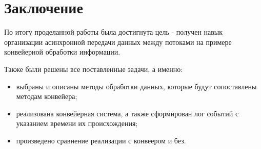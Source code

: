 \chapter*{Заключение}
По итогу проделанной работы была достигнута цель - получен навык организации асинхронной передачи данных между потоками на примере конвейерной обработки информации.

Также были решены все поставленные задачи, а именно:

\begin{itemize}
	\item выбраны и описаны методы обработки данных, которые будут сопоставлены методам конвейера;
	\item реализована конвейерная система, а также сформирован лог событий с указанием времени их происхождения;
	\item произведено сравнение реализации с конвеером и без.
\end{itemize}
